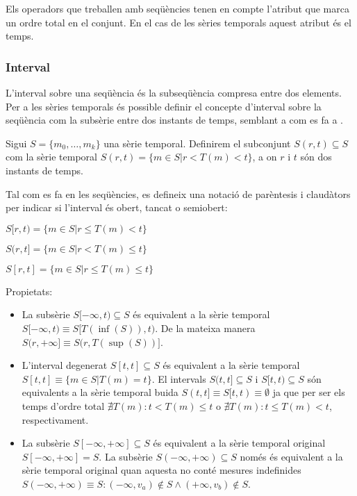 Els operadors que treballen amb seqüències tenen en compte l'atribut
que marca un ordre total en el conjunt. En el cas de les sèries
temporals aquest atribut és el temps.



\subsubsection{Interval}

L'interval sobre una seqüència és la subseqüència compresa entre dos
elements.  Per a les sèries temporals és possible definir el concepte
d'interval sobre la seqüència com la subsèrie entre dos instants de
temps, semblant a com es fa a \cite{last:keogh,last:hetland}.

\begin{definition}[Interval]
  \label{def:model:st-interval}
  Sigui $S=\{m_0, \ldots, m_k\}$ una sèrie temporal. Definirem el subconjunt
  $S(r,t) \subseteq S$ com la sèrie temporal $S(r,t)=\{m\in S
  | r<T(m)<t\}$, a on $r$ i $t$ són dos instants de temps.

  Tal com es fa en les seqüències, es defineix una notació de
  parèntesis i claudàtors per indicar si l'interval és obert, tancat o
  semiobert:

  $S[r,t)=\{m\in S  | r\leq T(m)< t\}$

  $S(r,t]=\{m\in S  | r<T(m)\leq t\}$

  $S[r,t]=\{m\in S  | r\leq T(m)\leq t\}$
\end{definition}


Propietats:
\begin{itemize}
\item La subsèrie $S[-\infty,t)\subseteq S$ és equivalent a la sèrie
  temporal $S[-\infty,t) \equiv S[T(\inf(S)),t)$. De la mateixa manera
  $S(r,+\infty] \equiv S(r,T(\sup(S))]$.

\item L'interval degenerat $S[t,t]\subseteq S$ és equivalent a la
  sèrie temporal $S[t,t] \equiv \{m\in S | T(m)=t \}$. El intervals
  $S(t,t]\subseteq S$ i $S[t,t)\subseteq S$ són equivalents a la sèrie
  temporal buida $S(t,t] \equiv S[t,t) \equiv \emptyset$ ja que per
  ser els temps d'ordre total $\nexists T(m): t < T(m) \leq t$ o
  $\nexists T(m): t \leq T(m) < t$, respectivament. 

\item La subsèrie $S[-\infty,+\infty] \subseteq S$ és equivalent a la
  sèrie temporal original $S[-\infty,+\infty] = S$. La subsèrie
  $S(-\infty,+\infty) \subseteq S$ només és equivalent a la sèrie
  temporal original quan aquesta no conté mesures indefinides
  $S(-\infty,+\infty) \equiv S: (-\infty,v_a)\notin S \wedge
  (+\infty,v_b)\notin S$.
\end{itemize}




